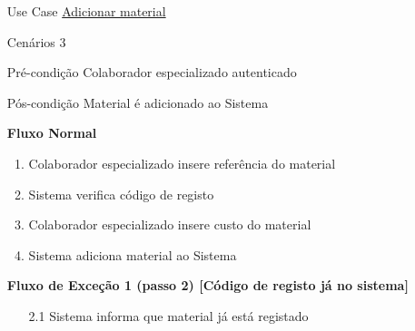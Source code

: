 \documentclass[../relatorio.tex]{subfiles}
\begin{document}
\begin{itemize}
    \item[Use Case] {\underline{Adicionar material}}
    \item[Cenários] {3}
    \item[Pré-condição] {Colaborador especializado autenticado}
    \item[Pós-condição] {Material é adicionado ao Sistema}
          \begin{flushleft}
              \textbf{Fluxo Normal}
          \end{flushleft}
          \begin{enumerate}
              \item Colaborador especializado insere referência do material
              \item Sistema verifica código de registo
              \item Colaborador especializado insere custo do material
              \item Sistema adiciona material ao Sistema
          \end{enumerate}
          \begin{flushleft}
              \textbf{Fluxo de Exceção 1 (passo 2) [Código de registo já no sistema]}
          \end{flushleft}
          \begin{itemize}
              \item[2.1] Sistema informa que material já está registado
          \end{itemize}
\end{itemize}
\end{document}
